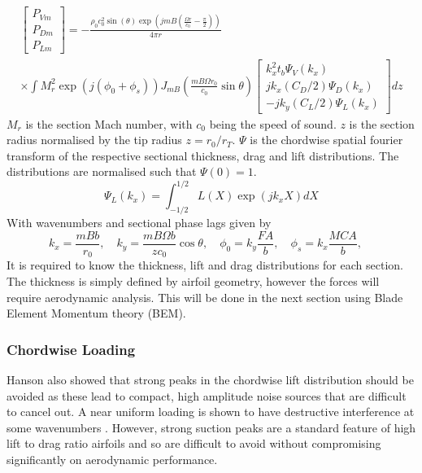 \documentclass{article}
\begin{document}
\begin{equation}
    \begin{aligned}
        \begin{bmatrix}
            P_{Vm} \\
            P_{Dm} \\
            P_{Lm}
        \end{bmatrix} = - \frac{\rho_0 c_0^2 \sin(\theta )\exp\left(jmB \left( \frac{\Omega r}{c_0} - \frac{\pi}{2} \right)\right)}{4\pi r} \\
        \times \int M_r^2 \exp(j(\phi_0 + \phi_s)) J_{mB} \left( \frac{mB\Omega r_0}{c_0} \sin \theta \right) \begin{bmatrix}
            k_x^2 t_b \Psi_V(k_x) \\
            jk_x (C_D / 2) \Psi_D(k_x) \\
            -jk_y (C_L / 2) \Psi_L(k_x)
        \end{bmatrix}dz
    \end{aligned}
    \label{eq:hansons_result}
\end{equation}
$M_r$ is the section Mach number, with $c_0$ being the speed of sound.
$z$ is the section radius normalised by the tip radius $z=r_0/r_T$.
$\Psi$ is the chordwise spatial fourier transform of the respective sectional thickness, drag and lift distributions.
The distributions are normalised such that $\Psi(0) = 1$.
\begin{equation}
    \Psi_L(k_x) = \int_{-1/2}^{1/2} L(X) \exp(jk_x X) dX
\end{equation}
With wavenumbers and sectional phase lags given by
\begin{equation}
    k_x = \frac{mB b}{r_0}, \quad
    k_y = \frac{mB\Omega b}{z c_0} \cos \theta, \quad
    \phi_0 = k_y \frac{FA}{b}, \quad
    \phi_s = k_x \frac{MCA}{b}, \quad
\end{equation}
It is required to know the thickness, lift and drag distributions for each section.
The thickness is simply defined by airfoil geometry, however the forces will require aerodynamic analysis.
This will be done in the next section using Blade Element Momentum theory (BEM).

\subsubsection{Chordwise Loading}
Hanson also showed that strong peaks in the chordwise lift distribution should be avoided
as these lead to compact, high amplitude noise sources that are difficult to cancel out.
A near uniform loading is shown to have destructive interference at some wavenumbers \cite{hanson_influence}.
However, strong suction peaks are a standard feature of high lift to drag ratio airfoils
and so are difficult to avoid without compromising significantly on aerodynamic performance.
\end{document}
